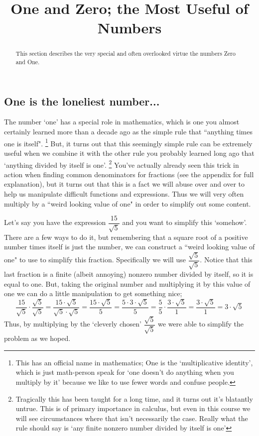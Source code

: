 \documentclass{ximeraXloud}
\title{One and Zero; the Most Useful of Numbers}
\begin{document}
\begin{abstract}
    This section describes the very special and often overlooked virtue the numbers Zero and One.
\end{abstract}
\maketitle

\subsection*{One is the loneliest number...}
    The number `one' has a special role in mathematics, which is one you almost certainly learned more than a decade ago as the simple rule that ``anything times one is itself".%
    \footnote{%
        This has an official name in mathematics; One is the `multiplicative identity', which is just math-person speak for `one doesn't do anything when you multiply by it' because we like to use fewer words and confuse people.%
        }
    But, it turns out that this seemingly simple rule can be extremely useful when we combine it with the other rule you probably learned long ago that `anything divided by itself is one'.%
    \footnote{%
        Tragically this has been taught for a long time, and it turns out it's blatantly untrue. This is of primary importance in calculus, but even in this course we will see circumstances where that isn't necessarily the case. Really what the rule should say is `any finite nonzero number divided by itself is one'%
        }
    You've actually already seen this trick in action when finding common denominators for fractions (see the appendix for full explanation), but it turns out that this is a fact we will abuse over and over to help us manipulate difficult functions and expressions. Thus we will very often multiply by a ``weird looking value of one" in order to simplify out some content.
    
    \begin{explanation}%
        Let's say you have the expression $\dfrac{15}{\sqrt{5}}$ and you want to simplify this `somehow'. There are a few ways to do it, but remembering that a square root of a positive number times itself is just the number, we can construct a ``weird looking value of one" to use to simplify this fraction. Specifically we will use $\dfrac{\sqrt{5}}{\sqrt{5}}$. Notice that this last fraction is a finite (albeit annoying) nonzero number divided by itself, so it is equal to one. But, taking the original number and multiplying it by this value of one we can do a little manipulation to get something nice;
        \[
            \dfrac{15}{\sqrt{5}} \cdot \dfrac{\sqrt{5}}{\sqrt{5}}
                = \dfrac{15 \cdot \sqrt{5}}{\sqrt{5}\cdot\sqrt{5}}
                = \dfrac{15 \cdot \sqrt{5}}{5}
                = \dfrac{5 \cdot 3 \cdot \sqrt{5}}{5}
                = \dfrac{5}{5} \cdot\dfrac{3 \cdot \sqrt{5}}{1}
                = \dfrac{3 \cdot \sqrt{5}}{1}
                = 3 \cdot \sqrt{5}
        \]
        Thus, by multiplying by the `cleverly chosen' $\dfrac{\sqrt{5}}{\sqrt{5}}$ we were able to simplify the problem as we hoped.
    \end{explanation}%
\end{document}
